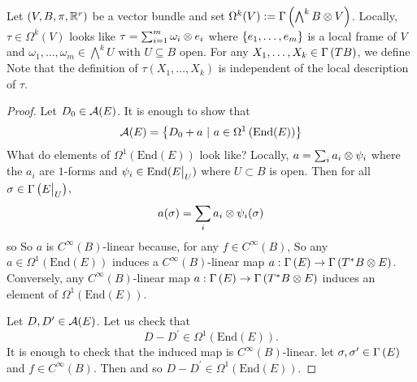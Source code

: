 \documentclass[main.tex]{subfiles}
\begin{document}
\begin{note}
Let $(V, B, \pi, \mathbb{R}^r)$ be a vector bundle and set $\Omega^k(V) := \Gamma\left( \bigwedge^k B \otimes V \right)$. Locally, $\tau \in \Omega^k(V)$ looks like $\tau = \sum_{i=1}^m \omega_i \otimes e_i$ where $\left\{e_1,\dots, e_m\right\}$ is a local frame of $V$ and $\omega_1, \dots, \omega_m \in \bigwedge^{k}U$ with $U \subseteq B$ open. For any $X_1, \dots, X_k \in \Gamma\left( TB \right)$, we define
Note that the definition of $\tau(X_1,\dots, X_k)$ is independent of the local description of $\tau$.
\end{note}

\begin{proof}

    Let $D_0 \in \mathcal{A}(E)$. It is enough to show that
\[
\mathcal{A}(E) = \left\{ D_0 + a \ | \  a \in \Omega^1\left( \text{End}(E) \right)  \right\}
\]
What do elements of $\Omega^1(\text{End}(E))$ look like? Locally, $a = \sum_{i}a_i \otimes \psi_i$ where the $a_i$ are $1$-forms and $\psi_i \in \text{End}(E\big|_{U})$ where $U \subset B$ is open. Then for all $\sigma \in \Gamma\left( E\big|_{U} \right)$,
\[
a(\sigma) = \sum_i a_i \otimes \psi_i(\sigma)
\]
so
So $a$ is $C^\infty(B)$-linear because, for any $f \in C^\infty(B)$,
So any $a \in \Omega^1(\text{End}(E))$ induces a $C^\infty(B)$-linear map $a : \Gamma\left( E \right) \to \Gamma\left( T^*B \otimes E \right)$. Conversely, any $C^\infty(B)$-linear map $a: \Gamma\left( E \right) \to \Gamma\left( T^*B\otimes E \right)$ induces an element of $\Omega^1(\text{End}(E))$.

Let $D, D^\prime \in \mathcal{A}(E)$. Let us check that \[
D - D^\prime \in \Omega^1(\text{End}(E)).
\]
It is enough to check that the induced map
is $C^\infty(B)$-linear. let $\sigma, \sigma^\prime \in \Gamma\left( E \right)$ and $f \in C^\infty(B)$. Then
and so $D - D^\prime \in \Omega^1(\text{End}(E))$.

\end{proof}
\end{document}
